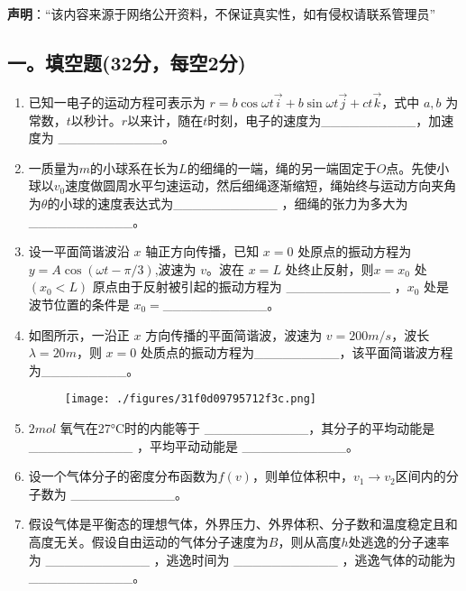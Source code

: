 
\textbf{声明}：“该内容来源于网络公开资料，不保证真实性，如有侵权请联系管理员”

\subsection{一。填空题(32分，每空2分)}
\begin{enumerate}
    \item 已知一电子的运动方程可表示为 $r = b \cos \omega t\vec{i} + b \sin \omega t\vec{j} + ct\vec{k}$，式中 $a,b$ 为常数，$t$以秒计。$r$以来计，随在$t$时刻，电子的速度为__________，加速度为 ___________。
    \item 一质量为$m$的小球系在长为$L$的细绳的一端，绳的另一端固定于$O$点。先使小球以$v_0$速度做圆周水平匀速运动，然后细绳逐渐缩短，绳始终与运动方向夹角为$\theta$的小球的速度表达式为___________ ，细绳的张力为多大为 ___________。
    \item 设一平面简谐波沿 $x$ 轴正方向传播，已知 $x=0$ 处原点的振动方程为$ y = A \cos(\omega t - \pi/3)$,波速为 $v$。波在 $x=L$ 处终止反射，则$x=x_0$ 处 $(x_0 < L)$ 原点由于反射被引起的振动方程为 ___________ ，$x_0$ 处是波节位置的条件是 $x_0 =$___________。
    \item 如图所示，一沿正 $x$ 方向传播的平面简谐波，波速为 $v = 200 m/s$，波长 $\lambda = 20 m$，则 $x = 0$ 处质点的振动方程为_________，该平面简谐波方程为_________。
\begin{figure}[ht]
\centering
\texttt{[image: ./figures/31f0d09795712f3c.png]}
\caption{} \label{fig_NJU10_1}
\end{figure}
    \item $2 mol$ 氧气在27°C时的内能等于 ___________，其分子的平均动能是 ___________ ，平均平动动能是 ___________。
    \item 设一个气体分子的密度分布函数为$f(v)$，则单位体积中，$v_1\to v_2$区间内的分子数为 ___________。
    \item 假设气体是平衡态的理想气体，外界压力、外界体积、分子数和温度稳定且和高度无关。假设自由运动的气体分子速度为$B$，则从高度$h$处逃逸的分子速率为 ___________ ，逃逸时间为 ___________ ，逃逸气体的动能为 ___________。
\end{enumerate}
